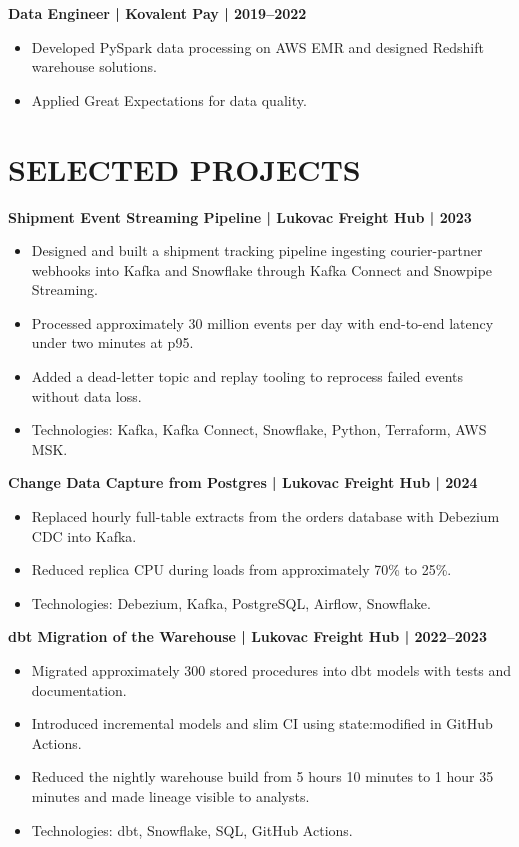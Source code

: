 \documentclass[11pt,a4paper]{article}
\begin{document}
\textbf{Data Engineer | Kovalent Pay | 2019–2022}
\begin{itemize}
\item Developed PySpark data processing on AWS EMR and designed Redshift warehouse solutions.
\item Applied Great Expectations for data quality.
\end{itemize}

\section*{SELECTED PROJECTS}
\textbf{Shipment Event Streaming Pipeline | Lukovac Freight Hub | 2023}
\begin{itemize}
\item Designed and built a shipment tracking pipeline ingesting courier-partner webhooks into Kafka and Snowflake through Kafka Connect and Snowpipe Streaming.
\item Processed approximately 30 million events per day with end-to-end latency under two minutes at p95.
\item Added a dead-letter topic and replay tooling to reprocess failed events without data loss.
\item Technologies: Kafka, Kafka Connect, Snowflake, Python, Terraform, AWS MSK.
\end{itemize}

\textbf{Change Data Capture from Postgres | Lukovac Freight Hub | 2024}
\begin{itemize}
\item Replaced hourly full-table extracts from the orders database with Debezium CDC into Kafka.
\item Reduced replica CPU during loads from approximately 70\% to 25\%.
\item Technologies: Debezium, Kafka, PostgreSQL, Airflow, Snowflake.
\end{itemize}

\textbf{dbt Migration of the Warehouse | Lukovac Freight Hub | 2022–2023}
\begin{itemize}
\item Migrated approximately 300 stored procedures into dbt models with tests and documentation.
\item Introduced incremental models and slim CI using state:modified in GitHub Actions.
\item Reduced the nightly warehouse build from 5 hours 10 minutes to 1 hour 35 minutes and made lineage visible to analysts.
\item Technologies: dbt, Snowflake, SQL, GitHub Actions.
\end{itemize}
\end{document}
